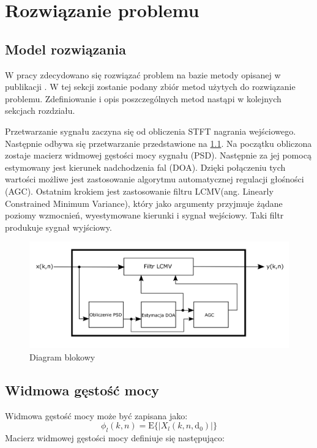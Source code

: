 \chapter{Rozwiązanie problemu}
\label{chapter-3}

\section{Model rozwiązania}

W pracy zdecydowano się rozwiązać problem na bazie metody opisanej w publikacji \cite{Braun2014}. W tej sekcji zostanie podany zbiór metod użytych do rozwiązanie problemu. Zdefiniowanie i opis poszczególnych metod nastąpi w kolejnych sekcjach rozdziału.

\noindent Przetwarzanie sygnału zaczyna się od obliczenia STFT nagrania wejściowego. Następnie odbywa się przetwarzanie przedstawione na \ref{fig:block_diagram}. Na początku obliczona zostaje macierz widmowej gęstości mocy sygnału (PSD). Następnie za jej pomocą estymowany jest kierunek nadchodzenia fal (DOA). Dzięki połączeniu tych wartości możliwe jest zastosowanie algorytmu automatycznej regulacji głośności (AGC). Ostatnim krokiem jest zastosowanie filtru LCMV(ang. Linearly Constrained Minimum Variance), który jako argumenty przyjmuje żądane poziomy wzmocnień, wyestymowane kierunki i sygnał wejściowy. Taki filtr produkuje sygnał wyjściowy. 

\begin{figure}[h]
    \centering
    \includegraphics[width=\textwidth]{Images/block_diagram.png}
    \caption{Diagram blokowy}
    \label{fig:block_diagram}
\end{figure}

\section{Widmowa gęstość mocy}

Widmowa gęstość mocy może być zapisana jako:
\begin{equation}
    \label{equation:PSD}
    \phi_{l}(k,n) = \mathrm{E}
    \{|X_{l}(k,n,\bm{\mathrm{d}}_{0})|\}
\end{equation}
Macierz widmowej gęstości mocy definiuje się następująco:

